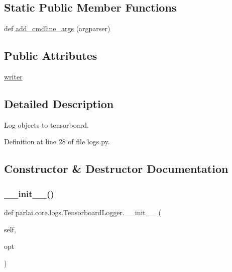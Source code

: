 \subsection*{Static Public Member Functions}
\begin{DoxyCompactItemize}
\item 
def \hyperlink{classparlai_1_1core_1_1logs_1_1TensorboardLogger_a22488a4b41a75dce0a1c467418882e83}{add\+\_\+cmdline\+\_\+args} (argparser)
\end{DoxyCompactItemize}
\subsection*{Public Attributes}
\begin{DoxyCompactItemize}
\item 
\hyperlink{classparlai_1_1core_1_1logs_1_1TensorboardLogger_afc71d93e950d01b95fc824d347907a58}{writer}
\end{DoxyCompactItemize}


\subsection{Detailed Description}
\begin{DoxyVerb}Log objects to tensorboard.
\end{DoxyVerb}
 

Definition at line 28 of file logs.\+py.



\subsection{Constructor \& Destructor Documentation}
\mbox{\label{classparlai_1_1core_1_1logs_1_1TensorboardLogger_a32a693076ca10238b30d06743c841ab4}} 
\subsubsection{\texorpdfstring{\+\_\+\+\_\+init\+\_\+\+\_\+()}{\_\_init\_\_()}}
{\footnotesize\ttfamily def parlai.\+core.\+logs.\+Tensorboard\+Logger.\+\_\+\+\_\+init\+\_\+\+\_\+ (\begin{DoxyParamCaption}\item[{}]{self,  }\item[{}]{opt }\end{DoxyParamCaption})}



